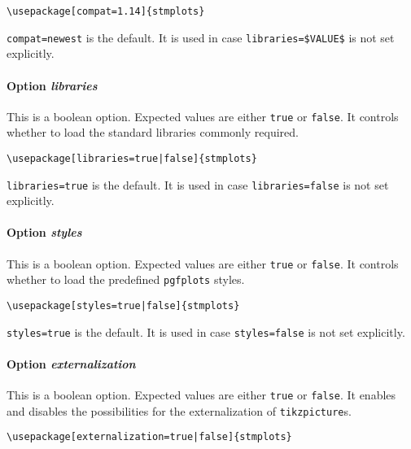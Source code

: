 \documentclass[%
  type=article,%
  layout=koma,%
  date=true,%
  hyperref=true,%
  listings=true,%
  math=true,%
  plots=false,%
]{stmtext}
\begin{document}
\begin{verbatim}
\usepackage[compat=1.14]{stmplots}
\end{verbatim}

\texttt{compat=newest} is the default. It is used in case \verb+libraries=$VALUE$+ is not set explicitly.

\paragraph{Option \protect\textit{libraries}} 
\label{sec:usage:preamble:wholepackage:options:libraries}

This is a boolean option. Expected values are either \texttt{true} or \texttt{false}. It controls whether to load the standard libraries commonly required.

\begin{verbatim}
\usepackage[libraries=true|false]{stmplots}
\end{verbatim}

\texttt{libraries=true} is the default. It is used in case \texttt{libraries=false} is not set explicitly.

\paragraph{Option \protect\textit{styles}} 
\label{sec:usage:preamble:wholepackage:options:styles}

This is a boolean option. Expected values are either \texttt{true} or \texttt{false}. It controls whether to load the predefined \texttt{pgfplots} styles.

\begin{verbatim}
\usepackage[styles=true|false]{stmplots}
\end{verbatim}

\texttt{styles=true} is the default. It is used in case \texttt{styles=false} is not set explicitly.

\paragraph{Option \protect\textit{externalization}} 
\label{sec:usage:preamble:wholepackage:options:externalization}

This is a boolean option. Expected values are either \texttt{true} or \texttt{false}. It enables and disables the possibilities for the externalization of \texttt{tikzpicture}s.

\begin{verbatim}
\usepackage[externalization=true|false]{stmplots}
\end{verbatim}
\end{document}
